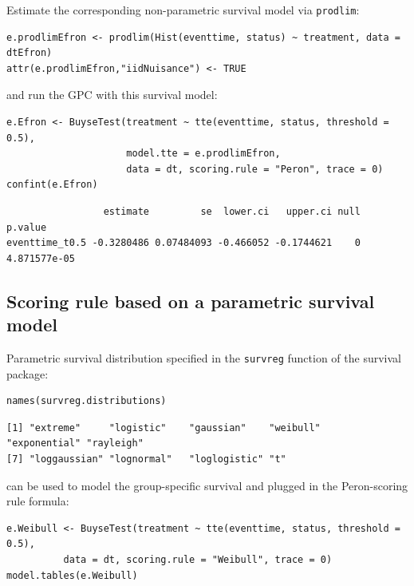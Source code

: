 \documentclass[12pt]{article}
\begin{document}
Estimate the corresponding non-parametric survival model via \texttt{prodlim}:
\lstset{language=r,label= ,caption= ,captionpos=b,numbers=none}
\begin{lstlisting}
e.prodlimEfron <- prodlim(Hist(eventtime, status) ~ treatment, data = dtEfron)
attr(e.prodlimEfron,"iidNuisance") <- TRUE
\end{lstlisting}

and run the GPC with this survival model:
\lstset{language=r,label= ,caption= ,captionpos=b,numbers=none}
\begin{lstlisting}
e.Efron <- BuyseTest(treatment ~ tte(eventtime, status, threshold = 0.5),
                     model.tte = e.prodlimEfron,
                     data = dt, scoring.rule = "Peron", trace = 0)
confint(e.Efron)
\end{lstlisting}

\begin{verbatim}
                 estimate         se  lower.ci   upper.ci null      p.value
eventtime_t0.5 -0.3280486 0.07484093 -0.466052 -0.1744621    0 4.871577e-05
\end{verbatim}

\subsection{Scoring rule based on a parametric survival model}
\label{sec:org6ff190f}

Parametric survival distribution specified in the \texttt{survreg} function of the survival package:
\lstset{language=r,label= ,caption= ,captionpos=b,numbers=none}
\begin{lstlisting}
names(survreg.distributions)
\end{lstlisting}

\begin{verbatim}
[1] "extreme"     "logistic"    "gaussian"    "weibull"     "exponential" "rayleigh"   
[7] "loggaussian" "lognormal"   "loglogistic" "t"
\end{verbatim}


can be used to model the group-specific survival and plugged in the
Peron-scoring rule formula:
\lstset{language=r,label= ,caption= ,captionpos=b,numbers=none}
\begin{lstlisting}
e.Weibull <- BuyseTest(treatment ~ tte(eventtime, status, threshold = 0.5),
          data = dt, scoring.rule = "Weibull", trace = 0)
model.tables(e.Weibull)
\end{lstlisting}
\end{document}
